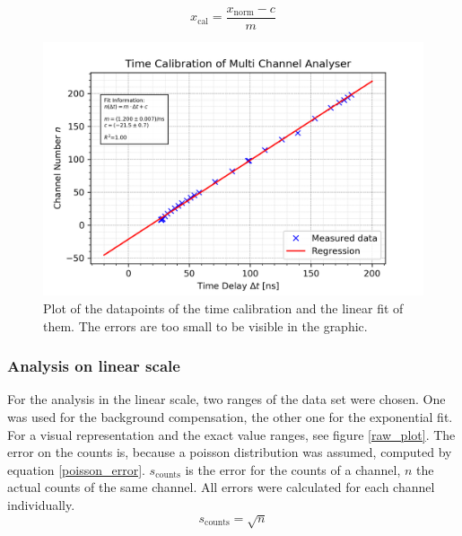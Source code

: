 \documentclass[30pt,a4paper]{article}
\begin{document}
 	\begin{equation}
 	x_{\text{cal}} = \frac{x_{\text{norm}}-c}{m}
 	\label{chn_to_time}
 	\end{equation}
 	
 	\begin{figure}[h]
 		\includegraphics{Bilder/time_cal}
 		\centering
 		\caption{\small Plot of the datapoints of the time calibration and the linear fit of them. The errors are too small to be visible in the graphic.}
 		\label{time_cal_plot}
 	\end{figure}
 	
 	\subsubsection{Analysis on linear scale}
 	For the analysis in the linear scale, two ranges of the data set were chosen.
 	One	was used for the background compensation, the other one for the exponential fit.
 	For a visual representation and the exact value ranges, see figure \ref{raw_plot}.
 	The error on the counts is, because a poisson distribution was assumed, computed by
 	equation \ref{poisson_error}. $s_{\text{counts}}$ is the error for the counts of a channel, $n$  the actual counts of the same channel. All errors were calculated for each channel individually.
 	\begin{equation}
 	s_{\text{counts}}=\sqrt{n}
 	\label{poisson_error}
 	\end{equation}
 	
\end{document}
